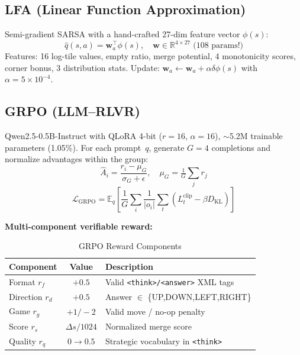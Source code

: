 \documentclass[conference, 10pt]{IEEEtran}
\begin{document}
\subsection{LFA (Linear Function Approximation)}
\label{sec:lfa}

Semi-gradient SARSA with a hand-crafted 27-dim feature vector $\phi(s)$:
\begin{equation}
\hat{q}(s,a)=\mathbf{w}_a^\top\phi(s),\quad \mathbf{w}\in\mathbb{R}^{4\times 27}\;\text{(108 params!)}
\end{equation}
Features: 16 log-tile values, empty ratio, merge potential, 4 monotonicity scores, corner bonus, 3 distribution stats.  Update: $\mathbf{w}_a \leftarrow \mathbf{w}_a + \alpha\delta\phi(s)$ with $\alpha{=}5{\times}10^{-4}$.

\subsection{GRPO (LLM--RLVR)}
\label{sec:grpo}

Qwen2.5-0.5B-Instruct with QLoRA 4-bit ($r{=}16$, $\alpha{=}16$), $\sim$5.2M trainable parameters (1.05\%).  For each prompt~$q$, generate $G{=}4$ completions and normalize advantages within the group:
\begin{equation}
\hat{A}_i=\frac{r_i-\mu_G}{\sigma_G+\epsilon},\quad \mu_G=\tfrac{1}{G}\!\sum_j r_j
\end{equation}
\begin{equation}
\mathcal{L}_{\text{GRPO}}=\mathbb{E}_q\!\left[\frac{1}{G}\sum_i\frac{1}{|o_i|}\sum_t\left(L_t^{\text{clip}}-\beta D_{\text{KL}}\right)\right]
\end{equation}

\noindent\textbf{Multi-component verifiable reward:}

\begin{table}[h]
\centering
\caption{GRPO Reward Components}
\label{tab:rewards}
\setlength{\tabcolsep}{4pt}
\begin{tabular}{@{}lcp{4.2cm}@{}}
\toprule
\textbf{Component} & \textbf{Value} & \textbf{Description} \\
\midrule
Format $r_f$ & $+0.5$ & Valid \texttt{<think>/<answer>} XML tags \\
Direction $r_d$ & $+0.5$ & Answer $\in$ \{UP,DOWN,LEFT,RIGHT\} \\
Game $r_g$ & $+1/-2$ & Valid move / no-op penalty \\
Score $r_s$ & $\Delta s/1024$ & Normalized merge score \\
Quality $r_q$ & $0{\to}0.5$ & Strategic vocabulary in \texttt{<think>} \\
\bottomrule
\end{tabular}
\end{table}
\end{document}
